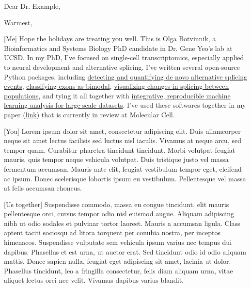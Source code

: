 \date{\today}
\opening{Dear Dr. Example,}
\closing{Warmest,}
\makelettertitle

[Me] Hope the holidays are treating you well. This is Olga Botvinnik, a  Bioinformatics and Systems Biology PhD candidate in Dr. Gene Yeo’s lab at UCSD. In my PhD, I’ve focused on single-cell transcriptomics, especially applied to neural development and alternative splicing. I’ve written several open-source Python packages, including \href{https://github.com/YeoLab/outrigger}{detecting and quantifying de novo alternative splicing events}, \href{https://github.com/YeoLab/anchor}{classifying exons as bimodal}, \href{https://github.com/YeoLab/bonvoyage}{visualizing changes in splicing between populations}, and tying it all together with \href{https://github.com/YeoLab/flotilla/}{integrative, reproducible machine learning analysis for large-scale datasets}. I’ve used these softwares together in my paper (\href{https://drive.google.com/file/d/0B44mjlWGbPILeUJVdWMtb0xDWDg/view?usp=sharing}{link}) that is currently in review at Molecular Cell.

[You] Lorem ipsum dolor sit amet, consectetur adipiscing elit. Duis ullamcorper neque sit amet lectus facilisis sed luctus nisl iaculis. Vivamus at neque arcu, sed tempor quam. Curabitur pharetra tincidunt tincidunt. Morbi volutpat feugiat mauris, quis tempor neque vehicula volutpat. Duis tristique justo vel massa fermentum accumsan. Mauris ante elit, feugiat vestibulum tempor eget, eleifend ac ipsum. Donec scelerisque lobortis ipsum eu vestibulum. Pellentesque vel massa at felis accumsan rhoncus.

[Us together] Suspendisse commodo, massa eu congue tincidunt, elit mauris pellentesque orci, cursus tempor odio nisl euismod augue. Aliquam adipiscing nibh ut odio sodales et pulvinar tortor laoreet. Mauris a accumsan ligula. Class aptent taciti sociosqu ad litora torquent per conubia nostra, per inceptos himenaeos. Suspendisse vulputate sem vehicula ipsum varius nec tempus dui dapibus. Phasellus et est urna, ut auctor erat. Sed tincidunt odio id odio aliquam mattis. Donec sapien nulla, feugiat eget adipiscing sit amet, lacinia ut dolor. Phasellus tincidunt, leo a fringilla consectetur, felis diam aliquam urna, vitae aliquet lectus orci nec velit. Vivamus dapibus varius blandit.

